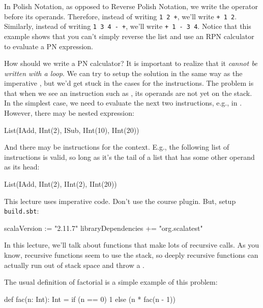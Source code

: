 \documentclass{book}
\begin{document}
In Polish Notation, as opposed to Reverse Polish Notation, we write the operator
before its operands. Therefore, instead of writing \texttt{1 2 +}, we'll write
\texttt{+ 1 2}. Similarly, instead of writing \texttt{1 3 4 - +}, we'll write
\texttt{+ 1 - 3 4}. Notice that this example shows that you can't simply reverse
the list and use an RPN calculator to evaluate a PN expression.

How should we write a PN calculator? It is important to realize that it
\emph{cannot be written with a loop}. We can try to setup the solution in the
same way as the imperative , but we'd get stuck in the
cases for the instructions. The problem is that when we see an instruction
such as , its operands are not yet on the stack.
In the simplest case, we need to evaluate the next two instructions, e.g.,
in . However, there may
be nested expression:
\begin{scalacode}
List(IAdd, IInt(2), ISub, IInt(10), IInt(20))
\end{scalacode}
And there may be instructions for the context. E.g., the following list
of instructions is valid, so long as it's the tail of a list that has
some other operand as its head:
\begin{scalacode}
List(IAdd, IInt(2), IInt(2), IInt(20))
\end{scalacode}




\begin{instructor}
This lecture uses imperative code. Don't use the course plugin. But, setup
\texttt{build.sbt}:

\begin{scalacode}
scalaVersion := "2.11.7"
libraryDependencies += "org.scalatest" %
\end{scalacode}
\end{instructor}

In this lecture, we'll talk about functions that make lots of recursive calls.
As you know, recursive functions seem to use the stack, so deeply recursive
functions can actually run out of stack space and throw a
.

The usual definition of factorial is a simple example of this problem:
\begin{scalacode}
def fac(n: Int): Int = if (n == 0) 1 else (n * fac(n - 1))
\end{scalacode}
\end{document}
